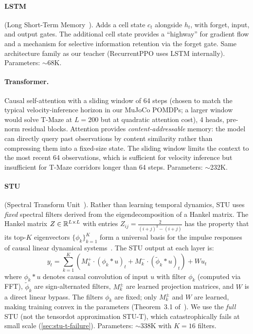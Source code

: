 \paragraph{LSTM} (Long Short-Term Memory~\citep{hochreiter1997lstm}).
Adds a cell state $c_t$ alongside $h_t$, with forget, input, and output gates.
The additional cell state provides a ``highway'' for gradient flow and a mechanism for selective information retention via the forget gate.
Same architecture family as our teacher (RecurrentPPO uses LSTM internally).
Parameters: $\sim$68K.

\paragraph{Transformer.}
Causal self-attention with a sliding window of 64 steps (chosen to match the typical velocity-inference horizon in our MuJoCo POMDPs; a larger window would solve T-Maze at $L{=}200$ but at quadratic attention cost), 4 heads, pre-norm residual blocks.
Attention provides \emph{content-addressable} memory: the model can directly query past observations by content similarity rather than compressing them into a fixed-size state.
The sliding window limits the context to the most recent 64 observations, which is sufficient for velocity inference but insufficient for T-Maze corridors longer than 64 steps.
Parameters: $\sim$232K.

\paragraph{STU} (Spectral Transform Unit~\citep{agarwal2024spectral, liu2025flashstu}).
Rather than learning temporal dynamics, STU uses \emph{fixed} spectral filters derived from the eigendecomposition of a Hankel matrix.
The Hankel matrix $Z \in \mathbb{R}^{L \times L}$ with entries $Z_{ij} = \frac{2}{(i+j)^3 - (i+j)}$ has the property that its top-$K$ eigenvectors $\{\phi_k\}_{k=1}^K$ form a universal basis for the impulse responses of causal linear dynamical systems~\citep{agarwal2024spectral}.
The STU output at each layer is:
\begin{equation}
  y_t = \sum_{k=1}^{K} \left( M_k^{+} \cdot (\phi_k * u)_t + M_k^{-} \cdot (\tilde{\phi}_k * u)_t \right) + W u_t
  \label{eq:stu}
\end{equation}
where $\phi_k * u$ denotes causal convolution of input $u$ with filter $\phi_k$ (computed via FFT), $\tilde{\phi}_k$ are sign-alternated filters, $M_k^{\pm}$ are learned projection matrices, and $W$ is a direct linear bypass.
The filters $\phi_k$ are fixed; only $M_k^{\pm}$ and $W$ are learned, making training convex in the parameters (Theorem~3.1 of~\citet{agarwal2024spectral}).
We use the \emph{full} STU (not the tensordot approximation STU-T), which catastrophically fails at small scale (\cref{sec:stu-t-failure}).
Parameters: $\sim$338K with $K=16$ filters.

